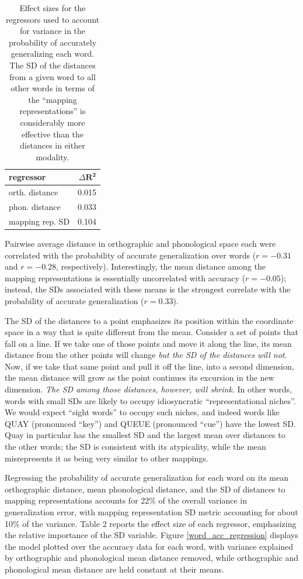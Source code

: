 \documentclass[10pt,letterpaper]{article}
\newcommand{\exword}[1]{\MakeUppercase{#1}}
\begin{document}
\begin{table}[b]
	\begin{center}
		\begin{tabular}{l r}
			\textbf{regressor} & $\Delta \mathbf{R^2}$\\
			\toprule
			orth. distance & 0.015\\
			phon. distance & 0.033\\
			mapping rep. SD & 0.104\\
		\end{tabular}
		\caption{Effect sizes for the regressors used to account for variance in the probability of accurately generalizing each word. The SD of the distances from a given word to all other words in terms of the ``mapping representations'' is considerably more effective than the distances in either modality.}
	\end{center}
\end{table}

Pairwise average distance in orthographic and phonological space each were correlated with the probability of accurate generalization over words ($r = -0.31$ and $r = -0.28$, respectively). Interestingly, the mean distance among the mapping representations is essentially uncorrelated with accuracy ($r = -0.05$); instead, the SDs associated with these means is the strongest correlate with the probability of accurate generalization ($r = 0.33$). 

The SD of the distances to a point emphasizes its position within the coordinate space in a way that is quite different from the mean. Consider a set of points that fall on a line. If we take one of those points and move it along the line, its mean distance from the other points will change \emph{but the SD of the distances will not}. Now, if we take that same point and pull it off the line, into a second dimension, the mean distance will grow as the point continues its excursion in the new dimension. \emph{The SD among those distances, however, will shrink}. In other words, words with small SDs are likely to occupy idiosyncratic ``representational niches''. We would expect ``sight words'' to occupy such niches, and indeed words like \exword{quay} (pronounced ``key'') and \exword{queue} (pronounced ``cue'') have the lowest SD. Quay in particular has the  smallest SD and the  largest mean over distances to the other words; the SD is consistent with its atypicality, while the mean misrepresents it as being very similar to other mappings.

Regressing the probability of accurate generalization for each word on its mean orthographic distance, mean phonological distance, and the SD of distances to mapping representations accounts for 22\% of the overall variance in generalization error, with mapping representation SD metric accounting for about 10\% of the variance. Table 2 reports the effect size of each regressor, emphasizing the relative importance of the SD variable. Figure \ref{word_acc_regression} displays the model plotted over the accuracy data for each word, with variance explained by orthographic and phonological mean distance removed, while orthographic and phonological mean distance are held constant at their means.
\end{document}
